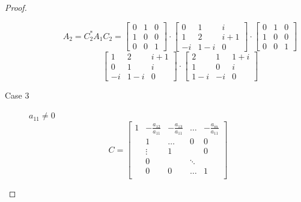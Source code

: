 \documentclass{article}
\begin{document}
\begin{proof}
\begin{description}
\begin{description}
          \[
            A_2 = C_2^* A_1 C_2 = \begin{bmatrix}
              0 & 1 & 0 \\
              1 & 0 & 0 \\
              0 & 0 & 1
            \end{bmatrix} \cdot \begin{bmatrix}
              0 & 1 & i \\
              1 & 2 & i+1 \\
              -i & 1-i & 0
            \end{bmatrix} \cdot \begin{bmatrix}
              0 & 1 & 0 \\
              1 & 0 & 0 \\
              0 & 0 & 1
            \end{bmatrix}
          \] \[
            \begin{bmatrix}
              1 & 2 & i+1 \\
              0 & 1 & i \\
              -i & 1-i & 0
            \end{bmatrix} \cdot \begin{bmatrix}
              2 & 1 & 1+i \\
              1 & 0 & i \\
              1-i & -i & 0
            \end{bmatrix}
          \]
      \end{description}
    \item[Case 3]
      $a_{11} \neq 0$
      \[
        C = \begin{bmatrix}
          1 & -\frac{a_{12}}{a_{11}} & -\frac{a_{13}}{a_{11}} & \dots  & -\frac{a_{in}}{a_{11}} \\
            & 1                      &                 \ldots &     0  &         0 \\
            & \vdots                 & 1                      &        &         0 \\
            & 0                      &                        & \ddots &           \\
            & 0                      & 0                      & \ldots &         1 \\
        \end{bmatrix}
      \]


\end{description}
\end{proof}
\end{document}
